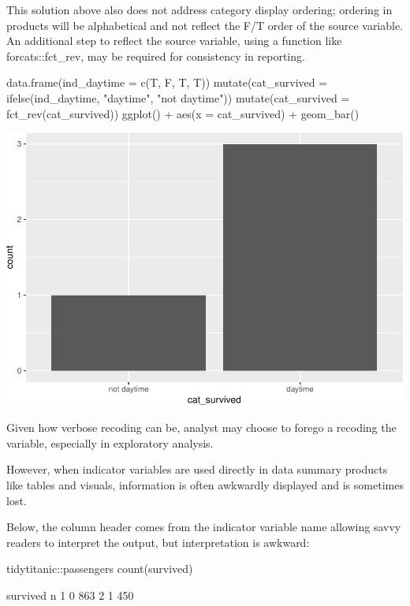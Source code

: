This solution above also does not address category display ordering;
ordering in products will be alphabetical and not reflect the F/T order
of the source variable. An additional step to reflect the source
variable, using a function like forcats::fct\_rev, may be required for
consistency in reporting.

\begin{Schunk}
\begin{Sinput}
data.frame(ind_daytime = c(T, F, T, T)) %
    mutate(cat_survived = ifelse(ind_daytime, "daytime", "not daytime")) %
  mutate(cat_survived = fct_rev(cat_survived)) %
  ggplot() + 
  aes(x = cat_survived) + 
  geom_bar()
\end{Sinput}

\includegraphics[width=0.69\linewidth]{r_journal_files/figure-latex/visual_status_quo_order-1} \end{Schunk}

Given how verbose recoding can be, analyst may choose to forego a
recoding the variable, especially in exploratory analysis.

However, when indicator variables are used directly in data summary
products like tables and visuals, information is often awkwardly
displayed and is sometimes lost.

Below, the column header comes from the indicator variable name allowing
savvy readers to interpret the output, but interpretation is awkward:

\begin{Schunk}
\begin{Sinput}
tidytitanic::passengers %
  count(survived) 
\end{Sinput}
\begin{Soutput}
       survived   n
     1        0 863
     2        1 450
\end{Soutput}
\end{Schunk}


